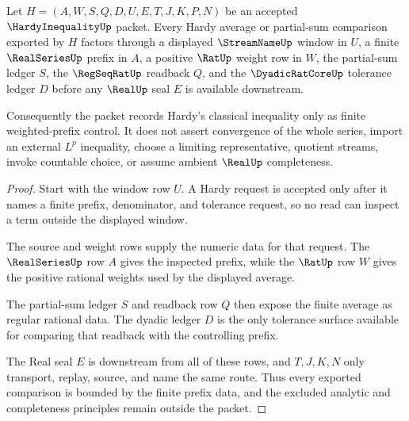 \begin{theorem}
\label{thm:hardy-inequality-partial-sum-boundary}
Let $H=(A,W,S,Q,D,U,E,T,J,K,P,N)$ be an accepted $\HardyInequalityUp$ packet. Every Hardy average or partial-sum comparison exported by $H$ factors through a displayed $\StreamNameUp$ window in $U$, a finite $\RealSeriesUp$ prefix in $A$, a positive $\RatUp$ weight row in $W$, the partial-sum ledger $S$, the $\RegSeqRatUp$ readback $Q$, and the $\DyadicRatCoreUp$ tolerance ledger $D$ before any $\RealUp$ seal $E$ is available downstream.

Consequently the packet records Hardy's classical inequality only as finite weighted-prefix control. It does not assert convergence of the whole series, import an external $L^p$ inequality, choose a limiting representative, quotient streams, invoke countable choice, or assume ambient $\RealUp$ completeness.
\end{theorem}
\begin{proof}
Start with the window row $U$. A Hardy request is accepted only after it names a finite prefix, denominator, and tolerance request, so no read can inspect a term outside the displayed window.

The source and weight rows supply the numeric data for that request. The $\RealSeriesUp$ row $A$ gives the inspected prefix, while the $\RatUp$ row $W$ gives the positive rational weights used by the displayed average.

The partial-sum ledger $S$ and readback row $Q$ then expose the finite average as regular rational data. The dyadic ledger $D$ is the only tolerance surface available for comparing that readback with the controlling prefix.

The Real seal $E$ is downstream from all of these rows, and $T,J,K,N$ only transport, replay, source, and name the same route. Thus every exported comparison is bounded by the finite prefix data, and the excluded analytic and completeness principles remain outside the packet.
\end{proof}


